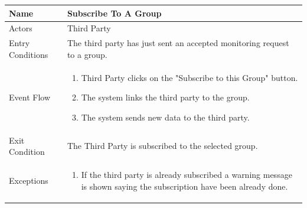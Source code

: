 \begin{enumerate}
\FloatBarrier
\begin{table}[h]
\begin{tabular}{|l|p{}|}
\hline
Name             & Subscribe To A Group\\ \hline
Actors           & Third Party  \\ \hline
Entry Conditions & The third party has just sent an accepted monitoring request to a group. \\ \hline
Event Flow       & \begin{enumerate}
            \item Third Party clicks on the "Subscribe to this Group" button.
			\item The system links the third party to the group.            
            \item The system sends new data to the third party.
        \end{enumerate}\\ \hline
Exit Condition   & The Third Party is subscribed to the selected group.\\ \hline
Exceptions       & \begin{enumerate}
            \item If the third party is already subscribed a warning message is shown saying the subscription have been already done.
        \end{enumerate}\\ \hline
\end{tabular}
\end{table}
\FloatBarrier


\end{enumerate}
